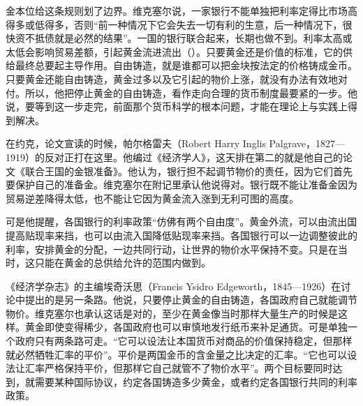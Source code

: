 金本位给这条规则划了边界。维克塞尔说，一家银行不能单独把利率定得比市场高得多或低得多，否则“前一种情况下它会失去一切有利的生意，后一种情况下，很快资不抵债就是必然的结果”\cite{wicksell1907}。一国的银行联合起来，长期也做不到。利率太高或太低会影响贸易差额，引起黄金流进流出（）\cite{wicksell1907}。只要黄金还是价值的标准，它的供给最终总要起主导作用\cite{wicksell1907}。自由铸造，就是谁都可以把金块按法定的价格铸成金币。只要黄金还能自由铸造，黄金过多以及它引起的物价上涨，就没有办法有效地对付\cite{wicksell1907}。所以，他把停止黄金的自由铸造，看作走向合理的货币制度最要紧的一步\cite{wicksell1907}。他说，要等到这一步走完，前面那个货币科学的根本问题，才能在理论上与实践上得到解决\cite{wicksell1907}。

在约克，论文宣读的时候，帕尔格雷夫（Robert Harry Inglis Palgrave，1827—1919）的反对正打在这里\cite{wicksell1907,wikisource2026}。他编过《经济学人》，这天排在第二的就是他自己的论文《联合王国的金银准备》\cite{baas1907}。他认为，银行担不起调节物价的责任，因为它们首先要保护自己的准备金\cite{wicksell1907}。维克塞尔在附记里承认他说得对。银行既不能让准备金因为贸易逆差降得太低，也不能让它因为黄金流入涨到无利可图的高度\cite{wicksell1907}。

可是他提醒，各国银行的利率政策“仿佛有两个自由度”\cite{wicksell1907}。黄金外流，可以由流出国提高贴现率来挡，也可以由流入国降低贴现率来挡\cite{wicksell1907}。各国银行可以一边调整彼此的利率，安排黄金的分配，一边共同行动，让世界的物价水平保持不变\cite{wicksell1907}。只是在当时，这只能在黄金的总供给允许的范围内做到\cite{wicksell1907}。

《经济学杂志》的主编埃奇沃思（Francis Ysidro Edgeworth，1845—1926）在讨论中提出的是另一条路。他说，只要停止黄金的自由铸造，各国政府自己就能调节物价\cite{wicksell1907,wikisource2026}。维克塞尔也承认这话是对的，至少在黄金像当时那样大量生产的时候是这样\cite{wicksell1907}。黄金即使变得稀少，各国政府也可以审慎地发行纸币来补足通货\cite{wicksell1907}。可是单独一个政府只有两条路可走\cite{wicksell1907}。“它可以设法让本国货币对商品的价值保持稳定，但那样就必然牺牲汇率的平价”\cite{wicksell1907}。平价是两国金币的含金量之比决定的汇率。“它也可以设法让汇率严格保持平价，但那样它自己就管不了物价水平”\cite{wicksell1907}。两个目标要同时达到，就需要某种国际协议，约定各国铸造多少黄金，或者约定各国银行共同的利率政策\cite{wicksell1907}。

